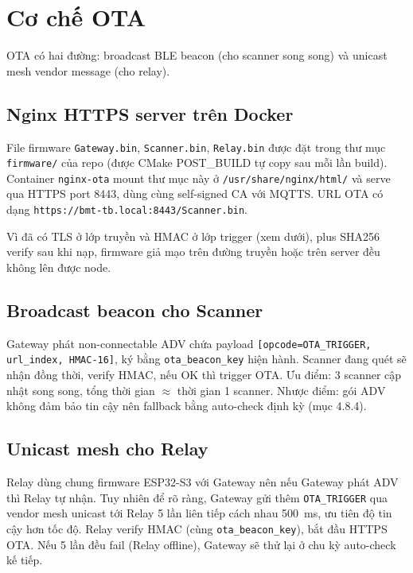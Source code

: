 \section{Cơ chế OTA}

OTA có hai đường: broadcast BLE beacon (cho scanner song song) và unicast mesh vendor message (cho relay).

\subsection{Nginx HTTPS server trên Docker}

File firmware \texttt{Gateway.bin}, \texttt{Scanner.bin}, \texttt{Relay.bin} được đặt trong thư mục \texttt{firmware/} của repo (được CMake POST\_BUILD tự copy sau mỗi lần build). Container \texttt{nginx-ota} mount thư mục này ở \texttt{/usr/share/nginx/html/} và serve qua HTTPS port 8443, dùng cùng self-signed CA với MQTTS. URL OTA có dạng \texttt{https://bmt-tb.local:8443/Scanner.bin}.

Vì đã có TLS ở lớp truyền và HMAC ở lớp trigger (xem dưới), plus SHA256 verify sau khi nạp, firmware giả mạo trên đường truyền hoặc trên server đều không lên được node.

\subsection{Broadcast beacon cho Scanner}

Gateway phát non-connectable ADV chứa payload \texttt{[opcode=OTA\_TRIGGER, url\_index, HMAC-16]}, ký bằng \texttt{ota\_beacon\_key} hiện hành. Scanner đang quét sẽ nhận đồng thời, verify HMAC, nếu OK thì trigger OTA. Ưu điểm: 3 scanner cập nhật song song, tổng thời gian $\approx$ thời gian 1 scanner. Nhược điểm: gói ADV không đảm bảo tin cậy nên fallback bằng auto-check định kỳ (mục 4.8.4).

\subsection{Unicast mesh cho Relay}

Relay dùng chung firmware ESP32-S3 với Gateway nên nếu Gateway phát ADV thì Relay tự nhận. Tuy nhiên để rõ ràng, Gateway gửi thêm \texttt{OTA\_TRIGGER} qua vendor mesh unicast tới Relay 5 lần liên tiếp cách nhau 500~ms, ưu tiên độ tin cậy hơn tốc độ. Relay verify HMAC (cùng \texttt{ota\_beacon\_key}), bắt đầu HTTPS OTA. Nếu 5 lần đều fail (Relay offline), Gateway sẽ thử lại ở chu kỳ auto-check kế tiếp.

